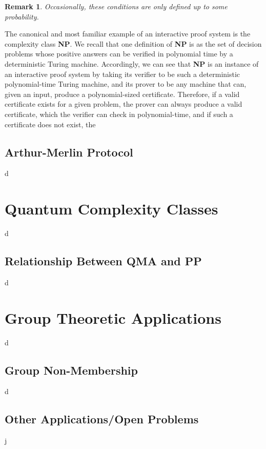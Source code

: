 \documentclass[12pt]{article}
\newtheorem*{rmk}{Remark}
\begin{document}
	\begin{rmk} Occasionally, these conditions are only defined up to some probability.\end{rmk}
	
	The canonical and most familiar example of an interactive proof system is the complexity class \textbf{NP}. We recall that one definition of \textbf{NP} is as the set of decision problems whose positive answers can be verified in polynomial time by a deterministic Turing machine. Accordingly, we can see that \textbf{NP} is an instance of an interactive proof system by taking its verifier to be such a deterministic polynomial-time Turing machine, and its prover to be any machine that can, given an input, produce a polynomial-sized certificate. Therefore, if a valid certificate exists for a given problem, the prover can always produce a valid certificate, which the verifier can check in polynomial-time, and if such a certificate does not exist, the 
	
	\subsection{Arthur-Merlin Protocol}
	d
    \section{Quantum Complexity Classes}
    d
    \subsection{Relationship Between QMA and PP}d
    
    \section{Group Theoretic Applications}
    d
    \subsection{Group Non-Membership}d
    \subsection{Other Applications/Open Problems}j
	
	
	
		
\end{document}
